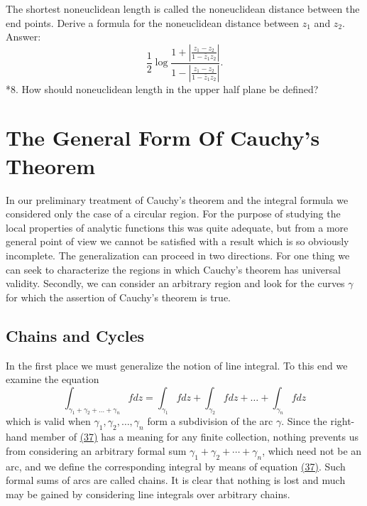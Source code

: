 The shortest noneuclidean length is called the noneuclidean distance
between the end points. Derive a formula for the noneuclidean distance between $z_{1}$ and $z_{2}$. Answer:
\begin{equation*}
\frac {1}{2} \log \frac {1 + \left| \frac {z _ {1} - z _ {2}}{1 - \bar {z} _ {1} z _ {2}} \right|}{1 - \left| \frac {z _ {1} - z _ {2}}{1 - \bar {z} _ {1} z _ {2}} \right|}.
\end{equation*}
*8. How should noneuclidean length in the upper half plane be defined?

\setcounter{section}{3}\section{The General Form Of Cauchy's Theorem}\label{sec:4.4}
In our preliminary treatment of Cauchy's theorem and the integral formula we considered only the case of a circular region. For the purpose of studying the local properties of analytic functions this was quite adequate, but from a more general point of view we cannot be satisfied with a result which is so obviously incomplete. The generalization can proceed in two directions. For one thing we can seek to characterize the regions in which Cauchy's theorem has universal validity. Secondly, we can consider an arbitrary region and look for the curves $\gamma$ for which the assertion of Cauchy's theorem is true.

\setcounter{section}{4}\setcounter{subsection}{0}\subsection{Chains and Cycles}\label{sec:4.4.1}
In the first place we must generalize the notion of line integral. To this end we examine the equation
\begin{equation*}
\int_ {\gamma_ {1} + \gamma_ {2} + \dots + \gamma_ {n}} f d z = \int_ {\gamma_ {1}} f d z + \int_ {\gamma_ {2}} f d z + \dots + \int_ {\gamma_ {n}} f d z\tag{37}\label{eq:4.37}
\end{equation*}
which is valid when $\gamma_{1}, \gamma_{2}, \ldots, \gamma_{n}$ form a subdivision of the arc $\gamma$. Since the right-hand member of \hyperref[eq:4.37]{(37)} has a meaning for any finite collection, nothing prevents us from considering an arbitrary formal sum $\gamma_{1} + \gamma_{2} + \cdots + \gamma_{n}$, which need not be an arc, and we define the corresponding integral by means of equation \hyperref[eq:4.37]{(37)}. Such formal sums of arcs are called chains. It is clear that nothing is lost and much may be gained by considering line integrals over arbitrary chains.


